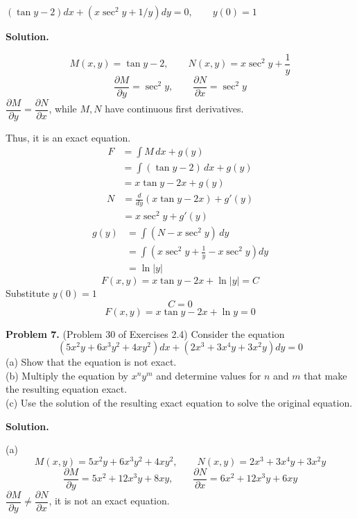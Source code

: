 \documentclass[11pt,a4paper]{article}
\begin{document}
$(\tan y-2)dx+(x\sec ^2y+1/y)dy=0, \quad \quad y(0)=1$
\medskip
\par\noindent
\textbf{Solution.}\par
\[
M(x,y)=\tan y-2,\qquad
N(x,y)=x\sec^2 y+\frac{1}{y}
\]
\[
\frac{\partial M}{\partial y}=\sec^2 y,\qquad
\frac{\partial N}{\partial x}=\sec^2 y
\]
$\dfrac{\partial M}{\partial y}=\dfrac{\partial N}{\partial x}$,
while $M,N$ have continuous first derivatives.

Thus, it is an exact equation.
\[
\begin{aligned}
F&=\int M\,dx+g(y)\\
 &=\int(\tan y-2)\,dx+g(y)\\
 &=x\tan y-2x+g(y)
\end{aligned}
\]
\[
\begin{aligned}
N&=\frac{d}{dy}(x\tan y-2x)+g'(y)\\
 &=x\sec^2 y+g'(y)
\end{aligned}
\]
\[
\begin{aligned}
g(y)&=\int(N-x\sec^2 y)\,dy\\
    &=\int\left(x\sec^2 y+\frac{1}{y}-x\sec^2 y\right)dy\\
    &=\ln|y|
\end{aligned}
\]
\[
F(x,y)=x\tan y-2x+\ln|y|=C
\]
Substitute $y(0)=1$
\[
C=0
\]
\[
F(x,y)=x\tan y-2x+\ln y=0
\]
\medskip

\bigskip
\noindent
{\bf Problem 7.}
(Problem 30 of Exercises 2.4) Consider the equation
$$
(5x^2y+6x^3y^2+4xy^2)dx+(2x^3+3x^4y+3x^2y)dy=0
$$
(a) Show that the equation is not exact.  \\
\noindent
(b) Multiply the equation by $x^ny^m$ and determine values for $n$ and $m$ that make the resulting equation exact. \\
\noindent
(c) Use the solution of the resulting exact equation to solve the original equation.

\medskip
\par\noindent
\textbf{Solution.}\par
\noindent
(a)
\[
M(x,y)=5x^2y+6x^3y^2+4xy^2,\qquad
N(x,y)=2x^3+3x^4y+3x^2y
\]
\[
\frac{\partial M}{\partial y}=5x^2+12x^3y+8xy,\qquad
\frac{\partial N}{\partial x}=6x^2+12x^3y+6xy
\]
$\dfrac{\partial M}{\partial y}\ne\dfrac{\partial N}{\partial x}$,
it is not an exact equation.
\end{document}
